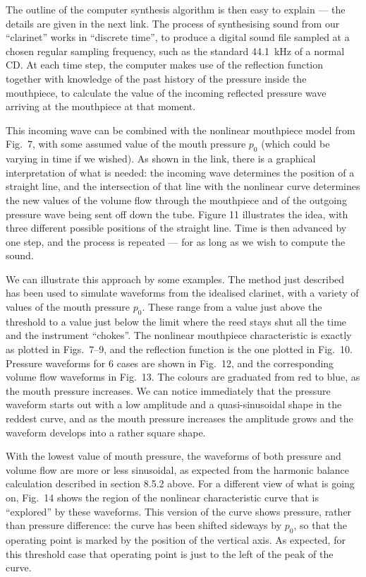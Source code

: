   The outline of the computer synthesis algorithm is then easy to explain — the 
  details are given in the next link. The process of synthesising sound from 
  our “clarinet” works in “discrete time”, to produce a digital sound file 
  sampled at a chosen regular sampling frequency, such as the standard 44.1~kHz 
  of a normal CD. At each time step, the computer makes use of the reflection 
  function together with knowledge of the past history of the pressure inside 
  the mouthpiece, to calculate the value of the incoming reflected pressure 
  wave arriving at the mouthpiece at that moment. 

  This incoming wave can be combined with the nonlinear mouthpiece model from 
  Fig.\ 7, with some assumed value of the mouth pressure $p_0$ (which could be 
  varying in time if we wished). As shown in the link, there is a graphical 
  interpretation of what is needed: the incoming wave determines the position 
  of a straight line, and the intersection of that line with the nonlinear 
  curve determines the new values of the volume flow through the mouthpiece and 
  of the outgoing pressure wave being sent off down the tube. Figure 11 
  illustrates the idea, with three different possible positions of the straight 
  line. Time is then advanced by one step, and the process is repeated — for as 
  long as we wish to compute the sound. 

  We can illustrate this approach by some examples. The method just described 
  has been used to simulate waveforms from the idealised clarinet, with a 
  variety of values of the mouth pressure $p_0$. These range from a value just 
  above the threshold to a value just below the limit where the reed stays shut 
  all the time and the instrument ``chokes''. The nonlinear mouthpiece 
  characteristic is exactly as plotted in Figs.\ 7--9, and the reflection 
  function is the one plotted in Fig.\ 10. Pressure waveforms for 6 cases are 
  shown in Fig.\ 12, and the corresponding volume flow waveforms in Fig.\ 13. 
  The colours are graduated from red to blue, as the mouth pressure increases. 
  We can notice immediately that the pressure waveform starts out with a low 
  amplitude and a quasi-sinusoidal shape in the reddest curve, and as the mouth 
  pressure increases the amplitude grows and the waveform develops into a 
  rather square shape. 

  With the lowest value of mouth pressure, the waveforms of both pressure and 
  volume flow are more or less sinusoidal, as expected from the harmonic 
  balance calculation described in section 8.5.2 above. For a different view of 
  what is going on, Fig.\ 14 shows the region of the nonlinear characteristic 
  curve that is ``explored'' by these waveforms. This version of the curve 
  shows pressure, rather than pressure difference: the curve has been shifted 
  sideways by $p_0$, so that the operating point is marked by the position of 
  the vertical axis. As expected, for this threshold case that operating point 
  is just to the left of the peak of the curve. 

